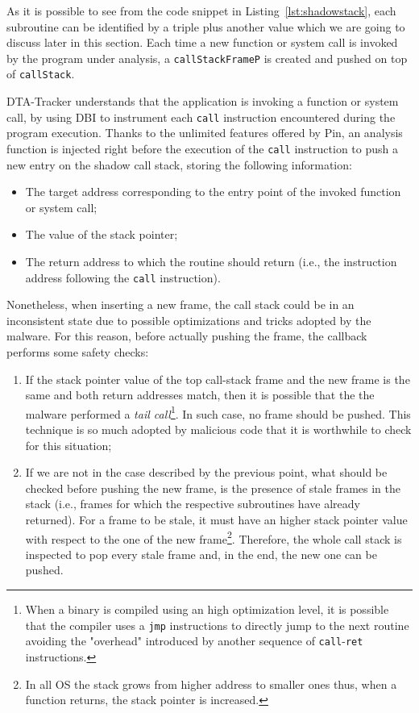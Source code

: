 \documentclass[LaM,binding=0.6cm]{sapthesis}
\begin{document}
\noindent
As it is possible to see from the code snippet in Listing~\ref{lst:shadowstack}, each subroutine can be identified by a triple plus another value which we are going to discuss later in this section. Each time a new function or system call is invoked by the program under analysis, a \texttt{callStackFrameP} is created and pushed on top of \texttt{callStack}.

{\sf DTA-Tracker} understands that the application is invoking a function or system call, by using DBI to instrument each \texttt{call} instruction encountered during the program execution. Thanks to the unlimited features offered by Pin, an analysis function is injected right before the execution of the \texttt{call} instruction to push a new entry on the shadow call stack, storing the following information:
\begin{itemize}
\item The target address corresponding to the entry point of the invoked function or system call;
\item The value of the stack pointer;
\item The return address to which the routine should return (i.e., the instruction address following the \texttt{call} instruction).
\end{itemize} 
Nonetheless, when inserting a new frame, the call stack could be in an inconsistent state due to possible optimizations and tricks adopted by the malware. For this reason, before actually pushing the frame, the callback performs some safety checks:
\begin{enumerate}
\item If the stack pointer value of the top call-stack frame and the new frame is the same and both return addresses match, then it is possible that the the malware performed a \textit{tail call}\footnote{When a binary is compiled using an high optimization level, it is possible that the compiler uses a \texttt{jmp} instructions to directly jump to the next routine avoiding the "overhead" introduced by another sequence of \texttt{call}-\texttt{ret} instructions.}. In such case, no frame should be pushed. This technique is so much adopted by malicious code that it is worthwhile to check for this situation;
\item If we are not in the case described by the previous point, what should be checked before pushing the new frame, is the presence of stale frames in the stack (i.e., frames for which the respective subroutines have already returned). For a frame to be stale, it must have an higher stack pointer value with respect to the one of the new frame\footnote{In all OS the stack grows from higher address to smaller ones thus, when a function returns, the stack pointer is increased.}. Therefore, the whole call stack is inspected to pop every stale frame and, in the end, the new one can be pushed.  
\end{enumerate}
\end{document}
